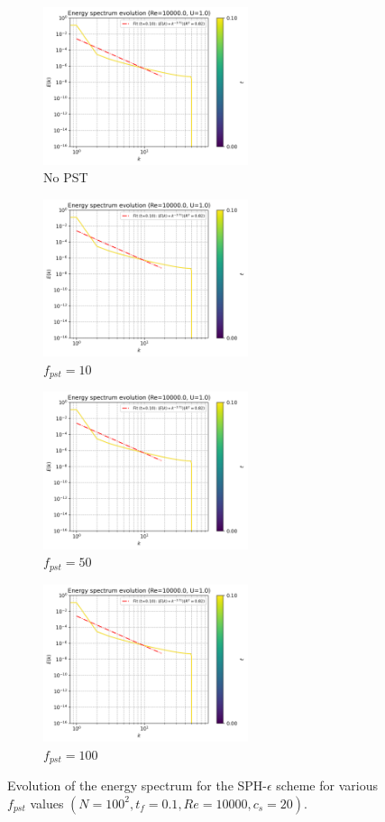 \begin{figure}[htbp!]
  \begin{subfigure}{7cm}
  \centering\includegraphics[width=6cm]{Code-Figures/mon2017/pst/c0_20_tait_pec_dtmul_1_nx_100_pst_-1_re_10000_mon2017/energy_spectrum_evolution.png}
  \caption{No PST}
  \end{subfigure}
  \begin{subfigure}{7cm}
  \centering\includegraphics[width=6cm]{Code-Figures/mon2017/pst/c0_20_tait_pec_dtmul_1_nx_100_pst_10_re_10000_mon2017/energy_spectrum_evolution.png}
  \caption{$f_{pst} = 10$}
  \end{subfigure}
  \begin{subfigure}{7cm}
  \centering\includegraphics[width=6cm]{Code-Figures/mon2017/pst/c0_20_tait_pec_dtmul_1_nx_100_pst_50_re_10000_mon2017/energy_spectrum_evolution.png}
  \caption{$f_{pst} = 50$}
  \end{subfigure}
  \begin{subfigure}{7cm}
  \centering\includegraphics[width=6cm]{Code-Figures/mon2017/pst/c0_20_tait_pec_dtmul_1_nx_100_pst_100_re_10000_mon2017/energy_spectrum_evolution.png}
  \caption{$f_{pst} = 100$}
  \end{subfigure}
  \caption{Evolution of the energy spectrum for the SPH-$\epsilon$ scheme for various $f_{pst}$ values $(N=100^2, t_f=0.1, Re=10000, c_s=20)$.}
  \label{fig:sph-eps-pst-espec}
\end{figure}
